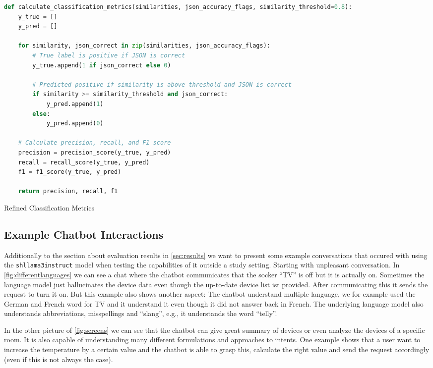 \begin{Listing}
    \begin{lstlisting}[language=Python]
    def calculate_classification_metrics(similarities, json_accuracy_flags, similarity_threshold=0.8):
    y_true = []
    y_pred = []

    for similarity, json_correct in zip(similarities, json_accuracy_flags):
        # True label is positive if JSON is correct
        y_true.append(1 if json_correct else 0)

        # Predicted positive if similarity is above threshold and JSON is correct
        if similarity >= similarity_threshold and json_correct:
            y_pred.append(1)
        else:
            y_pred.append(0)

    # Calculate precision, recall, and F1 score
    precision = precision_score(y_true, y_pred)
    recall = recall_score(y_true, y_pred)
    f1 = f1_score(y_true, y_pred)

    return precision, recall, f1
  \end{lstlisting}
    \caption{Refined Classification Metrics}
    \label{lst:classificationRefined}
\end{Listing}


\subsection{Example Chatbot Interactions}
\label{sec:chatbot-conv}
Additionally to the section about evaluation results in \cref{sec:results} we want to present some example conversations that occured with using the \texttt{shllama3instruct} model when testing the capabilities of it outside a study setting.
Starting with unpleasant conversation. In \cref{fig:differentlanguages} we can see a chat where the chatbot communicates that the socker ``TV'' is off but it is actually on. Sometimes the language model just hallucinates the device data even though the up-to-date device list ist provided. After communicating this it sends the request to turn it on. But this example also shows another aspect: The chatbot understand multiple language, we for example used the German and French word for TV and it understand it even though it did not answer back in French.
The underlying language model also understands abbreviations, misspellings and ``slang'', e.g., it understands the word ``telly''.

In the other picture of \cref{fig:screens} we can see that the chatbot can give great summary of devices or even analyze the devices of a specific room. It is also capable of understanding many different formulations and approaches to intents. One example shows that a user want to increase the temperature by a certain value and the chatbot is able to grasp this, calculate the right value and send the request accordingly (even if this is not always the case).

